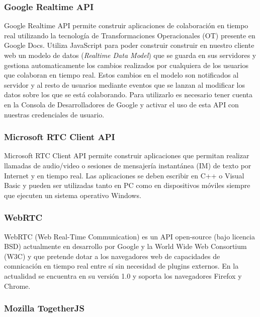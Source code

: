 	\subsubsection{Google Realtime API}\label{sssec:googleAPI}
	
	Google Realtime API \cite{ref:google_api} permite construir aplicaciones de colaboración en tiempo real utilizando la tecnología de Transformaciones Operacionales (OT) presente en Google Docs. Utiliza JavaScript para poder construir construir en nuestro cliente web un modelo de datos (\textit{Realtime Data Model}) que se guarda en sus servidores y gestiona automaticamente los cambios realizados por cualquiera de los usuarios que colaboran en tiempo real. Estos cambios en el modelo son notificados al servidor y al resto de usuarios mediante eventos que se lanzan al modificar los datos sobre los que se está colaborando. Para utilizarlo es necesario tener cuenta en la Consola de Desarrolladores de Google y activar el uso de esta API con nuestras credenciales de usuario.
	
	\subsubsection{Microsoft RTC Client API}
	
	Microsoft RTC Client API	 \cite{ref:microsoft_api} permite construir aplicaciones que permitan realizar llamadas de audio/video o sesiones de mensajería instantánea (IM) de texto por Internet y en tiempo real. Las aplicaciones se deben escribir en C++ o Visual Basic y pueden ser utilizadas tanto en PC como en dispositivos móviles siempre que ejecuten un sistema operativo Windows.
	
	\subsubsection{WebRTC}
	
	WebRTC \cite{ref:webRTC} (Web Real-Time Communication) es un API open-source (bajo licencia BSD) actualmente en desarrollo por Google y la World Wide Web Consortium (W3C) y que pretende dotar a los navegadores web de capacidades de comnicación en tiempo real entre sí sin necesidad de plugins externos. En la actualidad se encuentra en su versión 1.0 y soporta los navegadores Firefox y Chrome. 
	
	
	\subsubsection{Mozilla TogetherJS}


